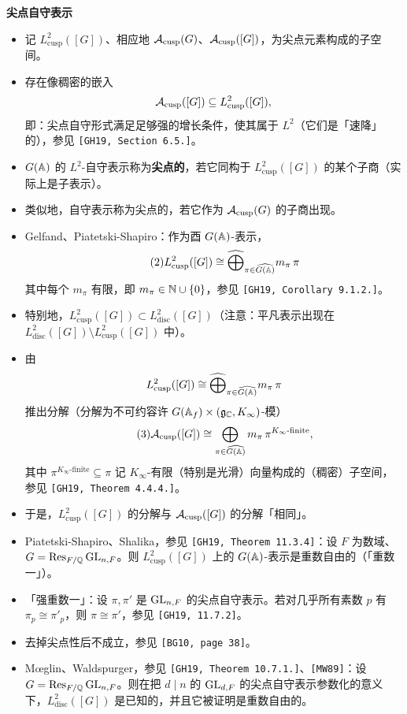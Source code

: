 \medskip
\noindent\textbf{尖点自守表示}
\begin{itemize}
\item 记 $L^2_{\mathrm{cusp}}([G])$、相应地 $\mathcal{A}_{\mathrm{cusp}}(G)$、$\mathcal{A}_{\mathrm{cusp}}([G])$，为尖点元素构成的子空间。
\item 存在像稠密的嵌入
\[
\mathcal{A}_{\mathrm{cusp}}([G])\subseteq L^2_{\mathrm{cusp}}([G]),
\]
即：尖点自守形式满足足够强的增长条件，使其属于 $L^2$（它们是「速降」的），参见 \texttt{[GH19, Section 6.5.]}。
\item $G(\mathbb{A})$ 的 $L^2$-自守表示称为\textbf{尖点的}，若它同构于 $L^2_{\mathrm{cusp}}([G])$ 的某个子商（实际上是子表示）。
\item 类似地，自守表示称为尖点的，若它作为 $\mathcal{A}_{\mathrm{cusp}}(G)$ 的子商出现。
\item Gelfand、Piatetski-Shapiro：作为酉 $G(\mathbb{A})$-表示，
\begin{equation}\tag{2}\label{eq:12.2}
L^2_{\mathrm{cusp}}([G])\cong\widehat{\bigoplus}_{\pi\in\widehat{G(\mathbb{A})}}m_\pi\,\pi
\end{equation}
其中每个 $m_\pi$ 有限，即 $m_\pi\in\mathbb{N}\cup\{0\}$，参见 \texttt{[GH19, Corollary 9.1.2.]}。

\item 特别地，$L^2_{\mathrm{cusp}}([G])\subset L^2_{\mathrm{disc}}([G])$（注意：平凡表示出现在 $L^2_{\mathrm{disc}}([G])\setminus L^2_{\mathrm{cusp}}([G])$ 中）。
\item 由
\[
L^2_{\mathrm{cusp}}([G])\cong\widehat{\bigoplus}_{\pi\in\widehat{G(\mathbb{A})}}m_\pi\,\pi
\]
推出分解（分解为不可约容许 $G(\mathbb{A}_f)\times(\mathfrak{g}_{\mathbb{C}},K_\infty)$-模）
\begin{equation}\tag{3}\label{eq:12.3}
\mathcal{A}_{\mathrm{cusp}}([G])\cong\bigoplus_{\pi\in\widehat{G(\mathbb{A})}}m_\pi\,\pi^{K_\infty\text{-}\mathrm{finite}},
\end{equation}
其中 $\pi^{K_\infty\text{-}\mathrm{finite}}\subseteq\pi$ 记 $K_\infty$-有限（特别是光滑）向量构成的（稠密）子空间，参见 \texttt{[GH19, Theorem 4.4.4.]}。
\item 于是，$L^2_{\mathrm{cusp}}([G])$ 的分解与 $\mathcal{A}_{\mathrm{cusp}}([G])$ 的分解「相同」。
\item Piatetski-Shapiro、Shalika，参见 \texttt{[GH19, Theorem 11.3.4]}：设 $F$ 为数域、$G=\operatorname{Res}_{F/\mathbb{Q}}\operatorname{GL}_{n,F}$。则 $L^2_{\mathrm{cusp}}([G])$ 上的 $G(\mathbb{A})$-表示是重数自由的（「重数一」）。
\item 「强重数一」：设 $\pi,\pi'$ 是 $\operatorname{GL}_{n,F}$ 的尖点自守表示。若对几乎所有素数 $p$ 有 $\pi_p\cong\pi'_p$，则 $\pi\cong\pi'$，参见 \texttt{[GH19, 11.7.2]}。
\item 去掉尖点性后不成立，参见 \texttt{[BG10, page 38]}。
\item Mœglin、Waldspurger，参见 \texttt{[GH19, Theorem 10.7.1.]}、\texttt{[MW89]}：设 $G=\operatorname{Res}_{F/\mathbb{Q}}\operatorname{GL}_{n,F}$。则在把 $d\mid n$ 的 $\operatorname{GL}_{d,F}$ 的尖点自守表示参数化的意义下，$L^2_{\mathrm{disc}}([G])$ 是已知的，并且它被证明是重数自由的。
\end{itemize}

